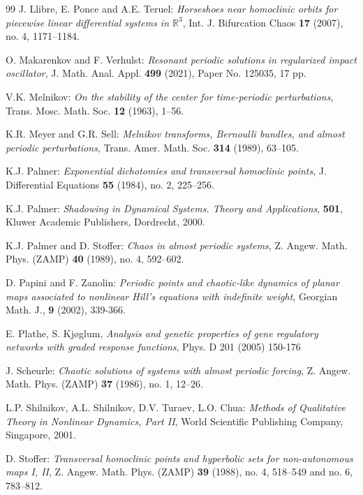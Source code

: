 \documentclass[10pt]{article}
\numberwithin{equation}{section}
\def\R{{\mathbb R}}
\theoremstyle{definition}
\theoremstyle{remark}
\begin{document}
\begin{thebibliography}{99}
 {\sc J. Llibre, E. Ponce and A.E. Teruel}:
{\it Horseshoes near homoclinic orbits for piecewise linear
differential systems in $\R^3$},
Int. J. Bifurcation Chaos {\bf 17} (2007), no. 4, 1171--1184.


 {\sc O. Makarenkov and F. Verhulst}: {\it Resonant periodic solutions in regularized impact oscillator},
J. Math. Anal. Appl. {\bf 499} (2021), Paper No. 125035, 17 pp.

{\sc V.K. Melnikov}:  {\it On the stability of the center for time-periodic perturbations},
Trans. Mosc. Math. Soc. {\bf 12} (1963), 1--56.

 {\sc K.R. Meyer and G.R. Sell}: {\it Melnikov transforms,
Bernoulli bundles, and almost periodic perturbations}, Trans.
Amer. Math. Soc. {\bf 314} (1989), 63--105.

 {\sc K.J. Palmer}: {\it Exponential dichotomies and transversal
homoclinic points}, J. Differential Equations {\bf 55} (1984), no. 2, 225--256.

 {\sc K.J. Palmer}: {\it Shadowing in Dynamical Systems. Theory and Applications},
{\bf 501}, Kluwer Academic Publishers, Dordrecht, 2000.

 {\sc K.J. Palmer and D. Stoffer}: {\it Chaos in almost periodic systems},
Z. Angew. Math. Phys.  (ZAMP) {\bf 40} (1989), no. 4, 592--602. %

{\sc  D. Papini and F. Zanolin}: {\it Periodic points and chaotic-like dynamics
of planar maps associated to nonlinear Hill's equations with
indefinite weight}, Georgian Math. J., {\bf 9} (2002),  339-366.


 {\sc E. Plathe, S. Kj{\o}glum},  {\it  Analysis and genetic properties of gene regulatory networks with graded response
    functions}, Phys.
D 201 (2005) 150-176
	
 {\sc J. Scheurle}: {\it Chaotic solutions of systems with almost periodic forcing},
Z. Angew. Math. Phys.  (ZAMP) {\bf 37} (1986), no. 1, 12--26.

 {\sc L.P. Shilnikov, A.L. Shilnikov, D.V. Turaev, L.O. Chua}: {\it Methods of Qualitative Theory in Nonlinear Dynamics, Part
    II}, World Scientific Publishing
    Company, Singapore, 2001.

 {\sc D. Stoffer}: {\it Transversal homoclinic points and hyperbolic sets for non-autonomous maps I, II},
Z. Angew. Math. Phys.  (ZAMP) {\bf 39} (1988), no. 4,  518--549 \textup{and} no. 6,  783--812.



\end{thebibliography}
\end{document}
